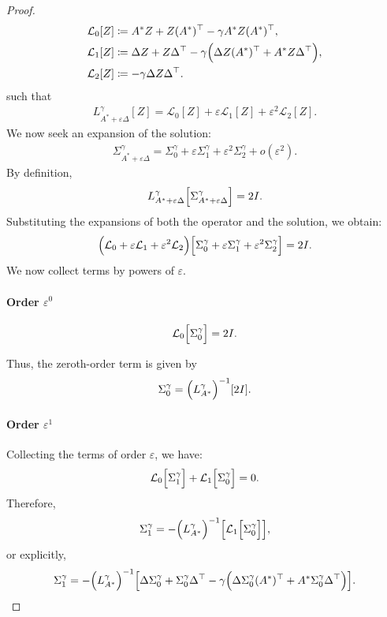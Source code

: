 \documentclass[10pt,a4paper]{amsart}
\newcommand{\eqdef}{\coloneqq}
\begin{document}
\begin{proof}
 \begin{align*}
\mathcal{L}_0[Z] &\eqdef A^*Z + Z (A^*)^\top - \gamma   A^*Z (A^*)^\top,\\
\mathcal{L}_1[Z] &\eqdef \Delta Z + Z \Delta^\top - \gamma\Bigl(\Delta Z (A^*)^\top + A^*Z \Delta^\top\Bigr),\\
\mathcal{L}_2[Z] &\eqdef - \gamma   \Delta Z \Delta^\top.
 \end{align*}
such that
 \begin{align*}
L^\gamma_{A^*+\varepsilon\Delta}[Z] = \mathcal{L}_0[Z] + \varepsilon  \mathcal{L}_1[Z] + \varepsilon^2  \mathcal{L}_2[Z].
 \end{align*}
We now seek an expansion of the solution:
 \begin{align*}
\Sigma^\gamma_{A^*+\varepsilon\Delta} = \Sigma_0^\gamma + \varepsilon  \Sigma_1^\gamma + \varepsilon^2  \Sigma_2^\gamma + o(\varepsilon^2).
 \end{align*}
By definition,
 \begin{align*}
L^\gamma_{A^*+\varepsilon\Delta}\Bigl[\Sigma^\gamma_{A^*+\varepsilon\Delta}\Bigr] = 2I.
 \end{align*}
Substituting the expansions of both the operator and the solution, we obtain:
 \begin{align*}
\Bigl(\mathcal{L}_0 + \varepsilon  \mathcal{L}_1 + \varepsilon^2  \mathcal{L}_2\Bigr)
\Bigl[\Sigma_0^\gamma + \varepsilon  \Sigma_1^\gamma + \varepsilon^2  \Sigma_2^\gamma\Bigr] = 2I.
 \end{align*}
We now collect terms by powers of $\varepsilon$.

\paragraph{Order \(\varepsilon^0\)}
 \begin{align*}
\mathcal{L}_0\Bigl[\Sigma_0^\gamma\Bigr] = 2I.
 \end{align*}

Thus, the zeroth-order term is given by
 \begin{align*}
\Sigma_0^\gamma = \Bigl(L^\gamma_{A^*}\Bigr)^{-1}[2I].
 \end{align*}

\paragraph{Order \(\varepsilon^1\)}
Collecting the terms of order $\varepsilon$, we have:
 \begin{align*}
\mathcal{L}_0\Bigl[\Sigma_1^\gamma\Bigr] + \mathcal{L}_1\Bigl[\Sigma_0^\gamma\Bigr] = 0.
 \end{align*}
Therefore,
 \begin{align*}
\Sigma_1^\gamma = -\Bigl(L^\gamma_{A^*}\Bigr)^{-1}\Bigl[\mathcal{L}_1\Bigl[\Sigma_0^\gamma\Bigr]\Bigr],
 \end{align*}
or explicitly,
 \begin{align*}
\Sigma_1^\gamma = -\Bigl(L^\gamma_{A^*}\Bigr)^{-1}\Bigl[
  \Delta  \Sigma_0^\gamma + \Sigma_0^\gamma  \Delta^\top - \gamma\Bigl(\Delta  \Sigma_0^\gamma  (A^*)^\top + A^*  \Sigma_0^\gamma  \Delta^\top\Bigr)
\Bigr].
 \end{align*}


\end{proof}
\end{document}
